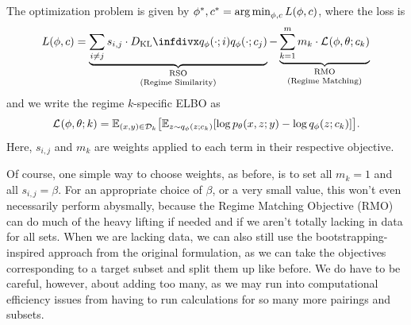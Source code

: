 \begin{proposition}
    The optimization problem is given by $\phi^*, c^* = \operatorname*{arg\,min}_{\phi, c} L(\phi, c)$, where the loss is
    \begin{equation}
        \label{eq:gen-calnf-loss}
        L(\phi, c) =
        \underbrace{\sum_{i\ne j} s_{i,j}\cdot \DKL{\qvd{\cdot;i}}{\qvd{\cdot;c_j}}}_{\substack{\mathstrut\text{RSO}\mathstrut\\\text{(Regime Similarity)}}}
        -\underbrace{\sum_{k=1}^m m_k\cdot \elbo{}{\phi,\theta;c_k}}_{\substack{\mathstrut\text{RMO}\mathstrut\\\text{(Regime Matching)}}}
    \end{equation}
    and we write the regime $k$-specific ELBO as
    \begin{equation}
        \elbo{}{\phi, \theta; k} = \EX{(x,y)\in \Data_k}{ \EX{z\sim \qvd{z;c_k}}{\log\pld{x,z;y}-\log\qvd{z;c_k}} }.
    \end{equation}
    Here, $s_{i,j}$ and $m_k$ are weights applied to each term in their respective objective.
\end{proposition}

Of course, one simple way to choose weights, as before, is to set all $m_k=1$ and all $s_{i,j}=\beta$. For an appropriate choice of $\beta$, or a very small value, this won't even necessarily perform abysmally, because the Regime Matching Objective (RMO) can do much of the heavy lifting if needed and if we aren't totally lacking in data for all sets. When we are lacking data, we can also still use the bootstrapping-inspired approach from the original formulation, as we can take the objectives corresponding to a target subset and split them up like before. We do have to be careful, however, about adding too many, as we may run into computational efficiency issues from having to run calculations for so many more pairings and subsets.

